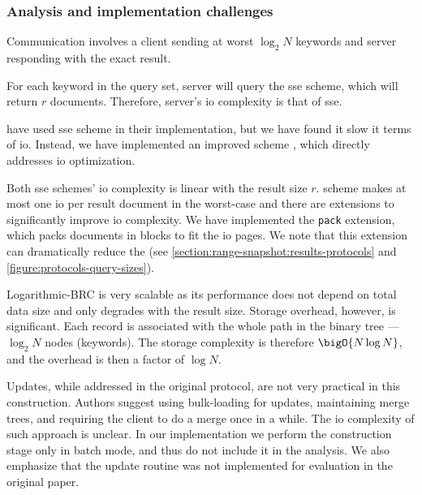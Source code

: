 	\subsubsection{Analysis and implementation challenges}

		Communication involves a client sending at worst $\log_2 N$ keywords and server responding with the exact result.

		For each keyword in the query set, server will query the \acrshort{sse} scheme, which will return $r$ documents.
		Therefore, server's \acrshort{io} complexity is that of \acrshort{sse}.

		\textcite{practical-range-search} have used \cite{cjjkrs-13} \acrshort{sse} scheme in their implementation, but we have found it slow it terms of \acrshort{io}.
		Instead, we have implemented an improved scheme \cite{cjjjkrs-14}, which directly addresses \acrshort{io} optimization.

		Both \acrshort{sse} schemes' \acrshort{io} complexity is linear with the result size $r$.
		\cite{cjjjkrs-14} scheme makes at most one \acrshort{io} per result document in the worst-case and there are extensions to significantly improve \acrshort{io} complexity. %
		We have implemented the \texttt{pack} extension, which packs documents in blocks to fit the \acrshort{io} pages.
		We note that this extension can dramatically reduce the  (see \cref{section:range-snapshot:results-protocols} and \cref{figure:protocols-query-sizes}).

		Logarithmic-BRC is very scalable as its performance does not depend on total data size and only degrades with the result size.
		Storage overhead, however, is significant.
		Each record is associated with the whole path in the binary tree --- $\log_2 N$ nodes (keywords).
		The storage complexity is therefore $\bigO{N \log N}$, and the overhead is then a factor of $\log N$.

		Updates, while addressed in the original protocol, are not very practical in this construction.
		Authors suggest using bulk-loading for updates, maintaining merge trees, and requiring the client to do a merge once in a while.
		The \acrshort{io} complexity of such approach is unclear.
		In our implementation we perform the construction stage only in batch mode, and thus do not include it in the analysis.
		We also emphasize that the update routine was not implemented for evaluation in the original paper.
